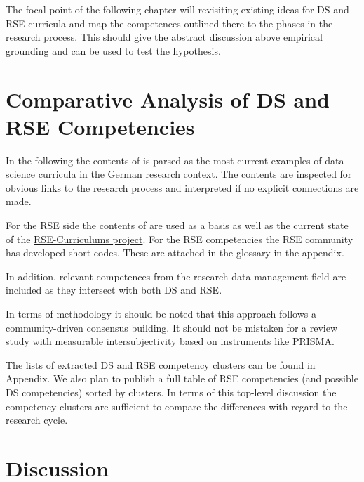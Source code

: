 \documentclass[
        english,biblatex
    ]{lni}
\begin{document}
    The focal point of the following chapter will revisiting existing
    ideas for DS and RSE curricula and map the competences outlined
    there to the phases in the research process. This should give the
    abstract discussion above empirical grounding and can be used to
    test the hypothesis.

    \section{Comparative Analysis of DS and RSE
    Competencies}\label{comparative-analysis-of-ds-and-rse-competencies}

    In the following the contents of \autocite{GI2021DataScience} is
    parsed as the most current examples of data science curricula in the
    German research context. The contents are inspected for obvious
    links to the research process and interpreted if no explicit
    connections are made.

    For the RSE side the contents of \autocite{Goth2024RSE} are used as
    a basis as well as the current state of the
    \href{https://github.com/juliandehne/RSE-Masters/blob/main/curriculum.md}{RSE-Curriculums
    project}. For the RSE competencies the RSE community has developed
    short codes. These are attached in the glossary in the appendix.

    In addition, relevant competences from the research data management
    field \autocite{petersen_2025_15025246} are included as they
    intersect with both DS and RSE.

    In terms of methodology it should be noted that this approach
    follows a community-driven consensus building. It should not be
    mistaken for a review study with measurable intersubjectivity based
    on instruments like \href{https://www.prisma-statement.org}{PRISMA}.

    The lists of extracted DS and RSE competency clusters can be found
    in Appendix. We also plan to publish a full table of RSE
    competencies (and possible DS competencies) sorted by clusters. In
    terms of this top-level discussion the competency clusters are
    sufficient to compare the differences with regard to the research
    cycle.

    \section{Discussion}\label{discussion}
\end{document}

